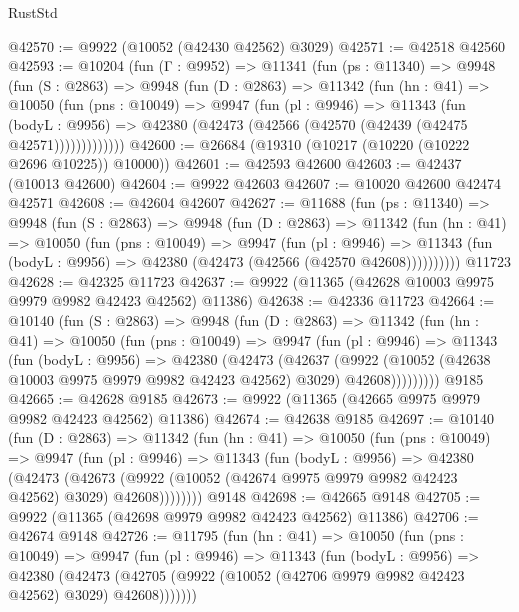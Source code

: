\begin{lexlean}{RustStd}
\begin{coremodule}
@42570 := @9922 (@10052 (@42430 @42562) @3029)
@42571 := @42518 @42560
@42593 := @10204
    (fun (Γ : @9952) =>
    @11341
      (fun (ps : @11340) =>
      @9948
        (fun (S : @2863) =>
        @9948
          (fun (D : @2863) =>
          @11342
            (fun (hn : @41) =>
            @10050
              (fun (pns : @10049) =>
              @9947
                (fun (pl : @9946) =>
                @11343
                  (fun (bodyL : @9956) =>
                  @42380 (@42473 (@42566 (@42570 (@42439 (@42475 @42571)))))))))))))
@42600 := @26684 (@19310 (@10217 (@10220 (@10222 @2696 @10225)) @10000))
@42601 := @42593 @42600
@42603 := @42437 (@10013 @42600)
@42604 := @9922 @42603
@42607 := @10020 @42600 @42474 @42571
@42608 := @42604 @42607
@42627 := @11688
    (fun (ps : @11340) =>
    @9948
      (fun (S : @2863) =>
      @9948
        (fun (D : @2863) =>
        @11342
          (fun (hn : @41) =>
          @10050
            (fun (pns : @10049) =>
            @9947
              (fun (pl : @9946) =>
              @11343 (fun (bodyL : @9956) => @42380 (@42473 (@42566 (@42570 @42608))))))))))
    @11723
@42628 := @42325 @11723
@42637 := @9922 (@11365 (@42628 @10003 @9975 @9979 @9982 @42423 @42562) @11386)
@42638 := @42336 @11723
@42664 := @10140
    (fun (S : @2863) =>
    @9948
      (fun (D : @2863) =>
      @11342
        (fun (hn : @41) =>
        @10050
          (fun (pns : @10049) =>
          @9947
            (fun (pl : @9946) =>
            @11343
              (fun (bodyL : @9956) =>
              @42380
                (@42473
                  (@42637
                    (@9922
                      (@10052 (@42638 @10003 @9975 @9979 @9982 @42423 @42562) @3029)
                      @42608)))))))))
    @9185
@42665 := @42628 @9185
@42673 := @9922 (@11365 (@42665 @9975 @9979 @9982 @42423 @42562) @11386)
@42674 := @42638 @9185
@42697 := @10140
    (fun (D : @2863) =>
    @11342
      (fun (hn : @41) =>
      @10050
        (fun (pns : @10049) =>
        @9947
          (fun (pl : @9946) =>
          @11343
            (fun (bodyL : @9956) =>
            @42380
              (@42473
                (@42673
                  (@9922 (@10052 (@42674 @9975 @9979 @9982 @42423 @42562) @3029) @42608))))))))
    @9148
@42698 := @42665 @9148
@42705 := @9922 (@11365 (@42698 @9979 @9982 @42423 @42562) @11386)
@42706 := @42674 @9148
@42726 := @11795
    (fun (hn : @41) =>
    @10050
      (fun (pns : @10049) =>
      @9947
        (fun (pl : @9946) =>
        @11343
          (fun (bodyL : @9956) =>
          @42380
            (@42473 (@42705 (@9922 (@10052 (@42706 @9979 @9982 @42423 @42562) @3029) @42608)))))))

\end{coremodule}
\end{lexlean}

